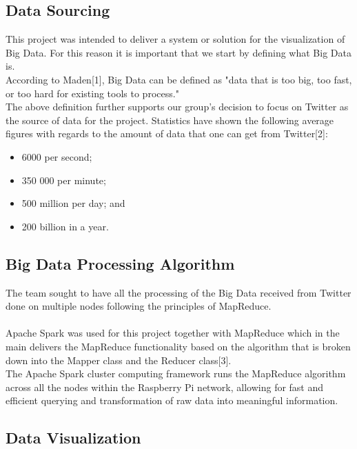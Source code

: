 \documentclass[12pt]{article} %
\begin{document}
	\subsection {Data Sourcing}
	
	This project was intended to deliver a system or solution for the visualization of Big Data. For this reason it is important that we start by defining what Big Data is.
	\\
	According to Maden[1], Big Data can be defined as "data that is too big, too fast, or too hard for existing tools to process."
	\\
	The above definition further supports our group's decision to focus on Twitter as the source of data for the project. Statistics have shown the following average figures with regards to the amount of data that one can get from Twitter[2]:
	\\
	
		\begin{itemize}
			\item 6000 per second; 
			\item 350 000 per minute;
			\item 500 million per day; and
			\item 200 billion in a year.
		\end{itemize}
	
	\subsection {Big Data Processing Algorithm}
	
	The team sought to have all the processing of the Big Data received from Twitter done on multiple nodes following the principles of MapReduce.
	\\
	\\
	Apache Spark was used for this project together with MapReduce which in the main delivers the MapReduce functionality based on the algorithm that is broken down into the Mapper class and the Reducer class[3].\\
	
	The Apache Spark cluster computing framework runs the MapReduce algorithm across all the nodes within the Raspberry Pi network, allowing for fast and efficient querying and transformation of raw data into meaningful information.
	
	\subsection{Data Visualization}
	
\end{document}
